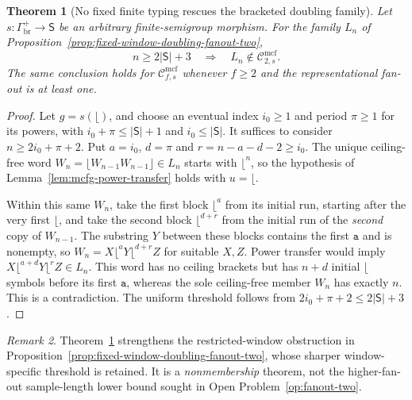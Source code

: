 \documentclass[11pt]{article}
\numberwithin{equation}{section}
\theoremstyle{plain}
\newtheorem{theorem}{Theorem}[section]
\theoremstyle{definition}
\theoremstyle{remark}
\newtheorem{remark}[theorem]{Remark}
\newcommand{\Cmcf}[2]{\mathcal{C}^{\mathrm{mcf}}_{#1,#2}}
\theoremstyle{plain}
\begin{document}
\begin{theorem}[No fixed finite typing rescues the bracketed doubling family]
\label{thm:mcfg-all-typing-doubling-obstruction}
Let $s:\Gamma_{\mathrm{br}}^+\to\mathsf S$ be an
\emph{arbitrary} finite-semigroup morphism.
For the family $L_n$ of
Proposition~\ref{prop:fixed-window-doubling-fanout-two},
\[
 n\ge2|\mathsf S|+3\quad\Longrightarrow\quad
 L_n\notin\Cmcf{2}{s}.
\]
The same conclusion holds for $\Cmcf{f}{s}$ whenever
$f\ge2$ and the representational fan-out is at least one.
\end{theorem}
\begin{proof}
Let $g=s(\lfloor)$, and choose an eventual index
$i_0\ge1$ and period $\pi\ge1$ for its powers,
with $i_0+\pi\le |\mathsf S|+1$ and $i_0\le|\mathsf S|$.
It suffices to consider $n\ge2i_0+\pi+2$.
Put $a=i_0$, $d=\pi$ and $r=n-a-d-2\ge i_0$.
The unique ceiling-free word
$W_n=\lfloor W_{n-1}W_{n-1}\rfloor\in L_n$
starts with $\lfloor^n$, so the hypothesis of
Lemma~\ref{lem:mcfg-power-transfer} holds with $u=\lfloor$.

Within this same $W_n$, take the first block
$\lfloor^a$ from its initial run, starting after
the very first $\lfloor$, and take the second
block $\lfloor^{d+r}$ from the initial run of
the \emph{second} copy of $W_{n-1}$.
The substring $Y$ between these blocks contains
the first $\mathtt a$ and is nonempty, so
$W_n=X\lfloor^aY\lfloor^{d+r}Z$ for suitable $X,Z$.
Power transfer would imply
$X\lfloor^{a+d}Y\lfloor^rZ\in L_n$.
This word has no ceiling brackets but has $n+d$
initial $\lfloor$ symbols before its first $\mathtt a$,
whereas the sole ceiling-free member $W_n$ has
exactly $n$.  This is a contradiction.
The uniform threshold follows from
$2i_0+\pi+2\le2|\mathsf S|+3$.
\end{proof}

\begin{remark}
Theorem~\ref{thm:mcfg-all-typing-doubling-obstruction}
strengthens the restricted-window obstruction in
Proposition~\ref{prop:fixed-window-doubling-fanout-two},
whose sharper window-specific threshold is retained.
It is a \emph{nonmembership} theorem, not the
higher-fan-out sample-length lower bound sought in
Open Problem~\ref{op:fanout-two}.
\end{remark}
\end{document}
